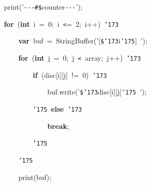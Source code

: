 \documentclass[a4paper,10pt]{article}
\def\mc{\relax}
\begin{document}
\noindent
\mbox{}{\tt\mc \ }{\tt\mc \ }{\tt\mc \ }{\tt\mc \ }print('{\tt -}{\tt -}{\tt -}{\tt\#}{\tt\$}counter{\tt -}{\tt -}{\tt -}');

\noindent
\mbox{}{\tt\mc \ }{\tt\mc \ }{\tt\mc \ }{\tt\mc \ }\textbf{for}{\tt\mc \ }(\textbf{int}{\tt\mc \ }i{\tt\mc \ }={\tt\mc \ }0;{\tt\mc \ }i{\tt\mc \ }{\tt <}={\tt\mc \ }2;{\tt\mc \ }i++){\tt\mc \ }{\tt\char'173}

\noindent
\mbox{}{\tt\mc \ }{\tt\mc \ }{\tt\mc \ }{\tt\mc \ }{\tt\mc \ }{\tt\mc \ }{\tt\mc \ }{\tt\mc \ }\textbf{var}{\tt\mc \ }buf{\tt\mc \ }={\tt\mc \ }StringBuffer('[{\tt\$}{\tt\char'173}i{\tt\char'175}]{\tt\mc \ }');

\noindent
\mbox{}{\tt\mc \ }{\tt\mc \ }{\tt\mc \ }{\tt\mc \ }{\tt\mc \ }{\tt\mc \ }{\tt\mc \ }{\tt\mc \ }\textbf{for}{\tt\mc \ }(\textbf{int}{\tt\mc \ }j{\tt\mc \ }={\tt\mc \ }0;{\tt\mc \ }j{\tt\mc \ }{\tt <}{\tt\mc \ }array;{\tt\mc \ }j++){\tt\mc \ }{\tt\char'173}

\noindent
\mbox{}{\tt\mc \ }{\tt\mc \ }{\tt\mc \ }{\tt\mc \ }{\tt\mc \ }{\tt\mc \ }{\tt\mc \ }{\tt\mc \ }{\tt\mc \ }{\tt\mc \ }{\tt\mc \ }{\tt\mc \ }\textbf{if}{\tt\mc \ }(disc[i][j]{\tt\mc \ }!={\tt\mc \ }0){\tt\mc \ }{\tt\char'173}

\noindent
\mbox{}{\tt\mc \ }{\tt\mc \ }{\tt\mc \ }{\tt\mc \ }{\tt\mc \ }{\tt\mc \ }{\tt\mc \ }{\tt\mc \ }{\tt\mc \ }{\tt\mc \ }{\tt\mc \ }{\tt\mc \ }{\tt\mc \ }{\tt\mc \ }{\tt\mc \ }{\tt\mc \ }buf.write('{\tt\$}{\tt\char'173}disc[i][j]{\tt\char'175}{\tt\mc \ }');

\noindent
\mbox{}{\tt\mc \ }{\tt\mc \ }{\tt\mc \ }{\tt\mc \ }{\tt\mc \ }{\tt\mc \ }{\tt\mc \ }{\tt\mc \ }{\tt\mc \ }{\tt\mc \ }{\tt\mc \ }{\tt\mc \ }{\tt\char'175}{\tt\mc \ }\textbf{else}{\tt\mc \ }{\tt\char'173}

\noindent
\mbox{}{\tt\mc \ }{\tt\mc \ }{\tt\mc \ }{\tt\mc \ }{\tt\mc \ }{\tt\mc \ }{\tt\mc \ }{\tt\mc \ }{\tt\mc \ }{\tt\mc \ }{\tt\mc \ }{\tt\mc \ }{\tt\mc \ }{\tt\mc \ }{\tt\mc \ }{\tt\mc \ }\textbf{break};

\noindent
\mbox{}{\tt\mc \ }{\tt\mc \ }{\tt\mc \ }{\tt\mc \ }{\tt\mc \ }{\tt\mc \ }{\tt\mc \ }{\tt\mc \ }{\tt\mc \ }{\tt\mc \ }{\tt\mc \ }{\tt\mc \ }{\tt\char'175}

\noindent
\mbox{}{\tt\mc \ }{\tt\mc \ }{\tt\mc \ }{\tt\mc \ }{\tt\mc \ }{\tt\mc \ }{\tt\mc \ }{\tt\mc \ }{\tt\char'175}

\noindent
\mbox{}{\tt\mc \ }{\tt\mc \ }{\tt\mc \ }{\tt\mc \ }{\tt\mc \ }{\tt\mc \ }{\tt\mc \ }{\tt\mc \ }print(buf);
\end{document}
